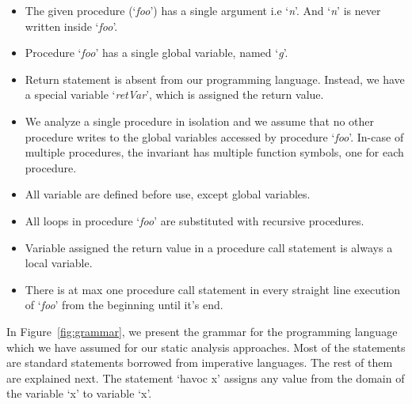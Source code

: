 \documentclass{llncs}
\newcommand{\foo}{\textit{foo}}
\newcommand{\retVar}{\textit{retVar}}
\newcommand{\n}{\textit{n}}
\newcommand{\g}{\textit{g}}
\begin{document}
\begin{itemize}
\item The given procedure (`\foo') has a single argument i.e `\n'. And
  `\n' is never written inside `\foo'.
\item Procedure `\foo' has a single global variable, named `\g'.
\item Return statement is absent from our programming language. Instead,
  we have a special variable `\retVar', which is assigned the return
  value.
\item We analyze a single procedure in isolation and we assume that no
  other procedure writes to the global variables accessed by procedure
  `\foo'. In-case of multiple procedures, the invariant has multiple
  function symbols, one for each procedure. 
\item All variable are defined before use, except global variables.
\item All loops in procedure `\foo' are substituted with 
  recursive procedures.
\item Variable assigned the return value in a procedure call
  statement is always a local variable.
\item There is at max one procedure call statement in every straight line
  execution of `\foo' from the beginning until it's end.
  \end{itemize}

In Figure~\ref{fig:grammar}, we present the grammar for the
programming language which we have assumed for our static analysis
approaches.  Most of the statements are standard statements borrowed
from imperative languages. The rest of them are explained next. The
statement `havoc x' assigns any value from the domain of the variable
`x' to variable `x'.
\end{document}
